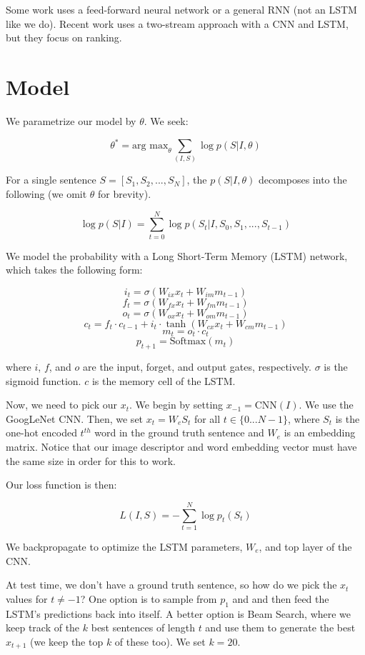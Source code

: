 \documentclass[a4paper]{article}
\begin{document}
Some work uses a feed-forward neural network or a general RNN (not an LSTM like
we do). Recent work uses a two-stream approach with a CNN and LSTM, but they
focus on ranking.

\section{Model}
We parametrize our model by $\theta$. We seek:

$$
\theta^* = \textrm{arg max}_{\theta}{\sum_{(I, S)}{\log p(S | I, \theta)}}
$$

For a single sentence $S = [S_1, S_2, ..., S_N]$, the $p(S|I, \theta)$
decomposes into the following (we omit $\theta$ for brevity).

$$
\log p(S|I) = \sum_{t=0}^{N}{\log p(S_t|I, S_0, S_1, ..., S_{t-1})}
$$

We model the probability with a Long Short-Term Memory (LSTM) network, which
takes the following form:

$$
i_t = \sigma(W_{ix} x_t + W_{im} m_{t-1})
$$
$$
f_t = \sigma(W_{fx} x_t + W_{fm} m_{t-1})
$$
$$
o_t = \sigma(W_{ox} x_t + W_{om} m_{t-1})
$$
$$
c_t = f_t \cdot c_{t-1} + i_t \cdot \tanh(W_{cx} x_t + W_{cm} m_{t-1})
$$
$$
m_t = o_t \cdot c_t
$$
$$
p_{t+1} = \textrm{Softmax}(m_t)
$$

where $i$, $f$, and $o$ are the input, forget, and output gates, respectively.
$\sigma$ is the sigmoid function. $c$ is the memory cell of the LSTM.

Now, we need to pick our $x_t$. We begin by setting $x_{-1} = \textrm{CNN}(I)$.
We use the GoogLeNet CNN. Then, we set $x_t = W_e S_t$ for all $t \in
\{0...N-1\}$, where $S_t$ is the one-hot encoded $t^{th}$ word in the ground
truth sentence and $W_e$ is an embedding matrix. Notice that our image
descriptor and word embedding vector must have the same size in order for
this to work.

Our loss function is then:

$$
L(I, S) = - \sum_{t=1}^{N}{\log p_t(S_t)}
$$

We backpropagate to optimize the LSTM parameters, $W_e$, and top layer of the
CNN.

At test time, we don't have a ground truth sentence, so how do we pick the
$x_t$ values for $t \ne -1$? One option is to sample from $p_1$ and and then
feed the LSTM's predictions back into itself. A better option is Beam Search,
where we keep track of the $k$ best sentences of length $t$ and use them
to generate the best $x_{t+1}$ (we keep the top $k$ of these too). We set
$k = 20$.
\end{document}
